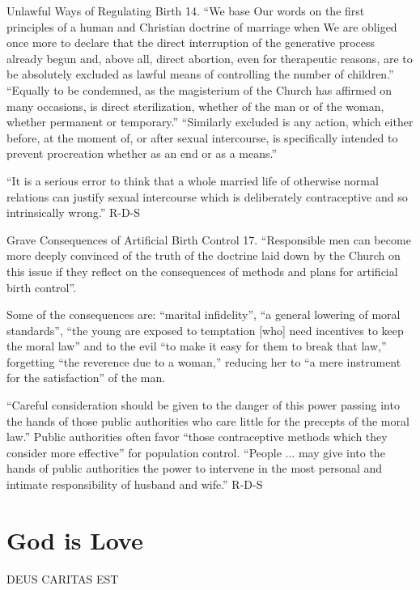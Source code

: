 \documentclass[oneside]{book}
\begin{document}
Unlawful Ways of Regulating Birth
14. ``We base Our words on the first principles of a human and Christian
doctrine of marriage when We are obliged once more to declare that the direct
interruption of the generative process already begun and, above all, direct
abortion, even for therapeutic reasons, are to be absolutely excluded as lawful
means of controlling the number of children.'' ``Equally to be condemned, as the
magisterium of the Church has affirmed on many occasions, is direct
sterilization, whether of the man or of the woman, whether permanent or
temporary.'' ``Similarly excluded is any action, which either before, at the
moment of, or after sexual intercourse, is specifically intended to prevent
procreation  whether as an end or as a means.''

``It is a serious error to think that a whole married life of otherwise normal
relations can justify sexual intercourse which is deliberately contraceptive and
so intrinsically wrong.''
R-D-S

Grave Consequences of Artificial Birth Control
17. ``Responsible men can become more deeply convinced of the truth of the
doctrine laid down by the Church on this issue if they reflect on the
consequences of methods and plans for artificial birth control''.

Some of the consequences are: ``marital infidelity'', ``a general lowering of
moral standards'', ``the young are exposed to temptation [who] need incentives
to keep the moral law'' and to the evil ``to make it easy for them to break that
law,'' forgetting ``the reverence due to a woman,'' reducing her to ``a mere
instrument for the satisfaction'' of the man.

``Careful  consideration should be given to the danger of this power passing
into the hands of those public authorities who care little for the precepts of
the moral law.''  Public authorities often favor ``those contraceptive methods
which they consider more effective''  for population control. ``People ... may
give into the hands of public authorities the power to intervene in the most
personal and intimate responsibility of husband and wife.''
R-D-S


\chapter{God is Love}

DEUS CARITAS EST
\end{document}
